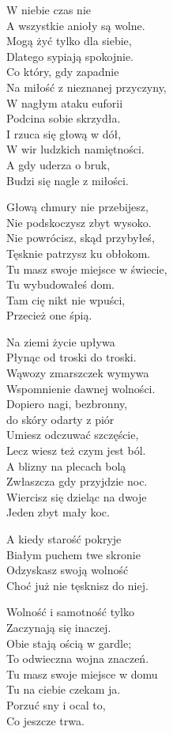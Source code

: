 \begin{text}
W niebie czas nie \\
A wszystkie anioły są wolne.\\
Mogą żyć tylko dla siebie,\\
Dlatego sypiają spokojnie.\\
Co który, gdy zapadnie\\
Na miłość z nieznanej przyczyny,\\
W nagłym ataku euforii\\
Podcina sobie skrzydła.\\
I rzuca się głową w dół,\\
W wir ludzkich namiętności.\\
A gdy uderza o bruk,\\
Budzi się nagle z miłości.

\vin Głową chmury nie przebijesz,\\
\vin Nie podskoczysz zbyt wysoko.\\
\vin Nie powrócisz, skąd przybyłeś,\\
\vin Tęsknie patrzysz ku obłokom.\\
\vin Tu masz swoje miejsce w świecie,\\
\vin Tu wybudowałeś dom.\\
\vin Tam cię nikt nie wpuści,\\
\vin Przecież one śpią.

Na ziemi życie upływa\\
Płynąc od troski do troski.\\
Wąwozy zmarszczek wymywa\\
Wspomnienie dawnej wolności.\\
Dopiero nagi, bezbronny,\\
do skóry odarty z piór\\
Umiesz odczuwać szczęście,\\
Lecz wiesz też czym jest ból.\\
A blizny na plecach bolą\\
Zwłaszcza gdy przyjdzie noc.\\
Wiercisz się dzieląc na dwoje\\
Jeden zbyt mały koc.

A kiedy starość pokryje\\
Białym puchem twe skronie\\
Odzyskasz swoją wolność\\
Choć już nie tęsknisz do niej.

Wolność i samotność tylko\\
Zaczynają się inaczej.\\
Obie stają ością w gardle;\\
To odwieczna wojna znaczeń.\\
Tu masz swoje miejsce w domu\\
Tu na ciebie czekam ja.\\
Porzuć sny i ocal to,\\
Co jeszcze trwa.
\end{text}

